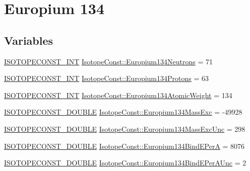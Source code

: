 \hypertarget{group___isotope_const-_europium-_eu134}{}\section{Europium 134}
\label{group___isotope_const-_europium-_eu134}
\subsection*{Variables}
\begin{DoxyCompactItemize}
\item 
\mbox{\hyperlink{group___isotope_const-_macros_ga5f18360b3e99483a35c32d789e62621c}{I\+S\+O\+T\+O\+P\+E\+C\+O\+N\+S\+T\+\_\+\+I\+NT}} \mbox{\hyperlink{group___isotope_const-_europium-_eu134_ga4f468e7ff194361d28b01a1bf0b5f356}{Isotope\+Const\+::\+Europium134\+Neutrons}} = 71
\item 
\mbox{\hyperlink{group___isotope_const-_macros_ga5f18360b3e99483a35c32d789e62621c}{I\+S\+O\+T\+O\+P\+E\+C\+O\+N\+S\+T\+\_\+\+I\+NT}} \mbox{\hyperlink{group___isotope_const-_europium-_eu134_ga553271d334ff231f0f2856e1c3aa03c8}{Isotope\+Const\+::\+Europium134\+Protons}} = 63
\item 
\mbox{\hyperlink{group___isotope_const-_macros_ga5f18360b3e99483a35c32d789e62621c}{I\+S\+O\+T\+O\+P\+E\+C\+O\+N\+S\+T\+\_\+\+I\+NT}} \mbox{\hyperlink{group___isotope_const-_europium-_eu134_gaacde92abf277257a920f62de2092bbb3}{Isotope\+Const\+::\+Europium134\+Atomic\+Weight}} = 134
\item 
\mbox{\hyperlink{group___isotope_const-_macros_ga8f45a7272ce02c0b4c65c44636ed719a}{I\+S\+O\+T\+O\+P\+E\+C\+O\+N\+S\+T\+\_\+\+D\+O\+U\+B\+LE}} \mbox{\hyperlink{group___isotope_const-_europium-_eu134_gae83ab72e19d14e6cd2247b7962b9a837}{Isotope\+Const\+::\+Europium134\+Mass\+Exc}} = -\/49928
\item 
\mbox{\hyperlink{group___isotope_const-_macros_ga8f45a7272ce02c0b4c65c44636ed719a}{I\+S\+O\+T\+O\+P\+E\+C\+O\+N\+S\+T\+\_\+\+D\+O\+U\+B\+LE}} \mbox{\hyperlink{group___isotope_const-_europium-_eu134_ga2dfc2b931e5b87722a5f2d9bf8325ae5}{Isotope\+Const\+::\+Europium134\+Mass\+Exc\+Unc}} = 298
\item 
\mbox{\hyperlink{group___isotope_const-_macros_ga8f45a7272ce02c0b4c65c44636ed719a}{I\+S\+O\+T\+O\+P\+E\+C\+O\+N\+S\+T\+\_\+\+D\+O\+U\+B\+LE}} \mbox{\hyperlink{group___isotope_const-_europium-_eu134_gad2357ab893eaaf868cfdb291c708c752}{Isotope\+Const\+::\+Europium134\+Bind\+E\+PerA}} = 8076
\item 
\mbox{\hyperlink{group___isotope_const-_macros_ga8f45a7272ce02c0b4c65c44636ed719a}{I\+S\+O\+T\+O\+P\+E\+C\+O\+N\+S\+T\+\_\+\+D\+O\+U\+B\+LE}} \mbox{\hyperlink{group___isotope_const-_europium-_eu134_ga9d15314f549570cec8493e7e9793f86e}{Isotope\+Const\+::\+Europium134\+Bind\+E\+Per\+A\+Unc}} = 2

\end{DoxyCompactItemize}
